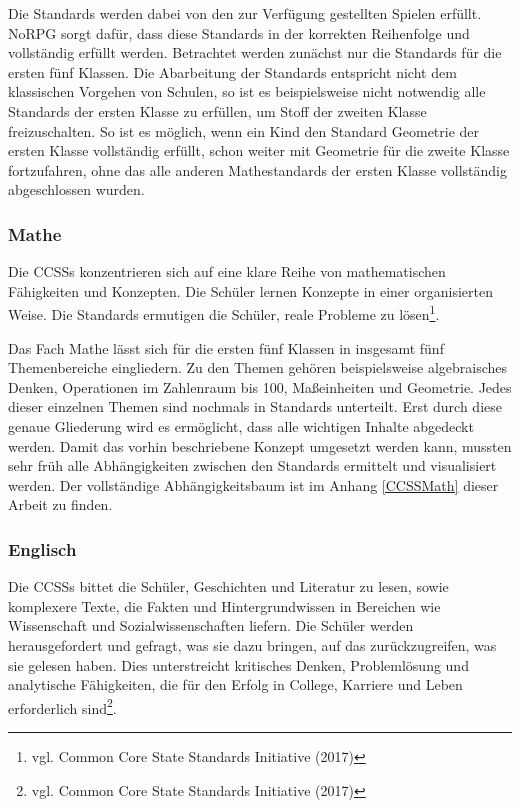 Die Standards werden dabei von den zur Verfügung gestellten Spielen erfüllt. NoRPG sorgt dafür, dass diese Standards in der korrekten Reihenfolge und vollständig erfüllt werden. Betrachtet werden zunächst nur die Standards für die ersten fünf Klassen. Die Abarbeitung der Standards entspricht nicht dem klassischen Vorgehen von Schulen, so ist es beispielsweise nicht notwendig alle Standards der ersten Klasse zu erfüllen, um Stoff der zweiten Klasse freizuschalten. So ist es möglich, wenn ein Kind den Standard Geometrie der ersten Klasse vollständig erfüllt, schon weiter mit Geometrie für die zweite Klasse fortzufahren, ohne das alle anderen Mathestandards der ersten Klasse vollständig abgeschlossen wurden.

\subsubsection{Mathe}
Die \acp{CCSS} konzentrieren sich auf eine klare Reihe von mathematischen Fähigkeiten und Konzepten. Die Schüler lernen Konzepte in einer organisierten Weise. Die Standards ermutigen die Schüler, reale Probleme zu lösen\footnote{vgl. Common Core State Standards Initiative \cite{ccss2} (2017)}.

Das Fach Mathe lässt sich für die ersten fünf Klassen in insgesamt fünf Themenbereiche eingliedern. Zu den Themen gehören beispielsweise algebraisches Denken, Operationen im Zahlenraum bis 100, Maßeinheiten und Geometrie. Jedes dieser einzelnen Themen sind nochmals in Standards unterteilt. Erst durch diese genaue Gliederung wird es ermöglicht, dass alle wichtigen Inhalte abgedeckt werden. Damit das vorhin beschriebene Konzept umgesetzt werden kann, mussten sehr früh alle Abhängigkeiten zwischen den Standards ermittelt und visualisiert werden. Der vollständige Abhängigkeitsbaum ist im Anhang \ref{CCSSMath} dieser Arbeit zu finden.

\subsubsection{Englisch}
Die \acp{CCSS} bittet die Schüler, Geschichten und Literatur zu lesen, sowie komplexere Texte, die Fakten und Hintergrundwissen in Bereichen wie Wissenschaft und Sozialwissenschaften liefern. Die Schüler werden herausgefordert und gefragt, was sie dazu bringen, auf das zurückzugreifen, was sie gelesen haben. Dies unterstreicht kritisches Denken, Problemlösung und analytische Fähigkeiten, die für den Erfolg in College, Karriere und Leben erforderlich sind\footnote{vgl. Common Core State Standards Initiative \cite{ccss3} (2017)}.

